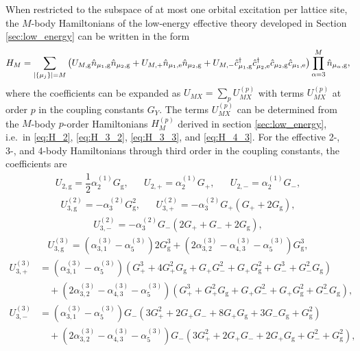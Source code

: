 \documentclass[preprint,showkeys,nofootinbib]{revtex4-1}
\newcommand{\f}{\dfrac} %
\newcommand{\p}[1]{\left(#1\right)} %
\renewcommand{\set}[1]{\left\{#1\right\}} %
\newcommand{\g}{\text{g}}
\newcommand{\e}{\text{e}}
\renewcommand{\c}{\hat{c}}
\newcommand{\n}{\hat{n}}
\newcommand{\1}{\mathds{1}}
\begin{document}
When restricted to the subspace of at most one orbital excitation per
lattice site, the $M$-body Hamiltonians of the low-energy effective
theory developed in Section \ref{sec:low_energy} can be written in the
form
\begin{align}
  H_M = \sum_{\abs{\set{\mu_j}}=M}
  \p{U_{M,\g} \n_{\mu_1,\g} \n_{\mu_2,\g}
    + U_{M,+} \n_{\mu_1,\e} \n_{\mu_2,\g}
    + U_{M,-} \c_{\mu_1,\g}^\dag \c_{\mu_2,\e}^\dag
    \c_{\mu_2,\g} \c_{\mu_1,\e}}
  \prod_{\alpha=3}^M \n_{\mu_\alpha,\g},
\end{align}
where the coefficients can be expanded as
$U_{MX} = \sum_p U_{MX}^{(p)}$ with terms $U_{MX}^{(p)}$ at order $p$
in the coupling constants $G_Y$.  The terms $U_{MX}^{(p)}$ can be
determined from the $M$-body $p$-order Hamiltonians $H_M^{(p)}$
derived in section \ref{sec:low_energy}, i.e.~in \eqref{eq:H_2},
\eqref{eq:H_3_2}, \eqref{eq:H_3_3}, and \eqref{eq:H_4_3}.  For the
effective 2-, 3-, and 4-body Hamiltonians through third order in the
coupling constants, the coefficients are
\begin{align}
  U_{2,\g} = \f12 \alpha_2^{(1)} G_\g,
  &&
  U_{2,+} = \alpha_2^{(1)} G_+,
  &&
  U_{2,-} = \alpha_2^{(1)} G_-,
\end{align}
\begin{align}
  U_{3,\g}^{(2)} = - \alpha_3^{(2)} G_\g^2,
  &&
  U_{3,+}^{(2)} = - \alpha_3^{(2)} G_+ \p{G_+ + 2 G_\g},
\end{align}
\begin{align}
  U_{3,-}^{(2)} = - \alpha_3^{(2)} G_- \p{2 G_+ + G_- + 2 G_\g},
\end{align}
\begin{align}
  U_{3,\g}^{(3)}
  = \p{\alpha_{3,1}^{(3)} - \alpha_5^{(3)}} 2 G_\g^3
  + \p{2\alpha_{3,2}^{(3)} - \alpha_{4,3}^{(3)} - \alpha_5^{(3)}} G_\g^3,
\end{align}
\begin{align}
  U_{3,+}^{(3)}
  &= \p{\alpha_{3,1}^{(3)} - \alpha_5^{(3)}} \p{G_+^3 + 4 G_+^2 G_\g
    + G_+ G_-^2 + G_+ G_\g^2 + G_-^3 + G_-^2 G_\g} \nonumber \\
  &\quad + \p{2\alpha_{3,2}^{(3)} - \alpha_{4,3}^{(3)} - \alpha_5^{(3)}}
  \p{G_+^3 + G_+^2 G_\g + G_+ G_-^2 + G_+ G_\g^2 + G_-^2 G_\g},
\end{align}
\begin{align}
  U_{3,-}^{(3)}
  &= \p{\alpha_{3,1}^{(3)} - \alpha_5^{(3)}} G_- \p{3 G_+^2
    + 2 G_+ G_- + 8 G_+ G_\g + 3 G_- G_\g + G_\g^2} \nonumber \\
  &\quad + \p{2\alpha_{3,2}^{(3)} - \alpha_{4,3}^{(3)} - \alpha_5^{(3)}}
  G_- \p{3 G_+^2 + 2 G_+ G_- + 2 G_+ G_\g + G_-^2 + G_\g^2},
\end{align}
\end{document}
